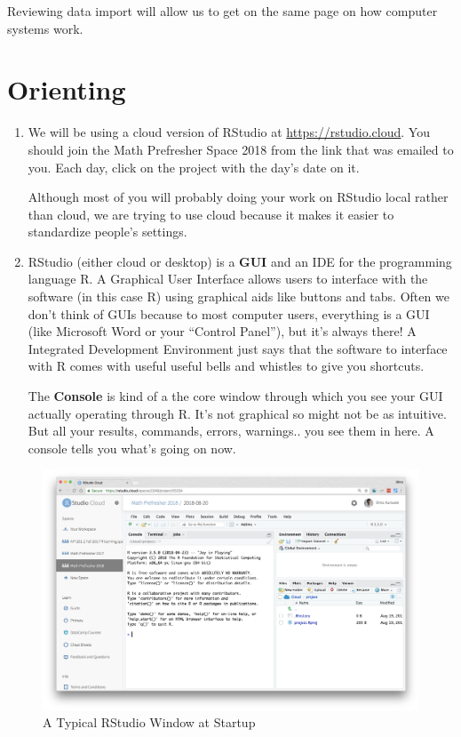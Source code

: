 \documentclass[]{book}
\theoremstyle{definition}
\theoremstyle{definition}
\theoremstyle{definition}
\theoremstyle{remark}
\begin{document}
Reviewing data import will allow us to get on the same page on how
computer systems work.

\section{Orienting}\label{orienting}

\begin{enumerate}
\def\labelenumi{\arabic{enumi}.}
\item
  We will be using a cloud version of RStudio at
  \url{https://rstudio.cloud}. You should join the Math Prefresher Space
  2018 from the link that was emailed to you. Each day, click on the
  project with the day's date on it.

  Although most of you will probably doing your work on RStudio local
  rather than cloud, we are trying to use cloud because it makes it
  easier to standardize people's settings.
\item
  RStudio (either cloud or desktop) is a \textbf{GUI} and an IDE for the
  programming language R. A Graphical User Interface allows users to
  interface with the software (in this case R) using graphical aids like
  buttons and tabs. Often we don't think of GUIs because to most
  computer users, everything is a GUI (like Microsoft Word or your
  ``Control Panel''), but it's always there! A Integrated Development
  Environment just says that the software to interface with R comes with
  useful useful bells and whistles to give you shortcuts.

  The \textbf{Console} is kind of a the core window through which you
  see your GUI actually operating through R. It's not graphical so might
  not be as intuitive. But all your results, commands, errors,
  warnings.. you see them in here. A console tells you what's going on
  now.
\end{enumerate}

\begin{figure}
\centering
\includegraphics{images/11_1_rstudio-startup.png}
\caption{A Typical RStudio Window at Startup}
\end{figure}
\end{document}

